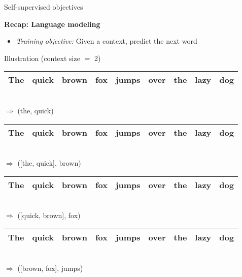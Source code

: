 
\begin{vbframe}{Self-supervised objectives}

\vfill

\textbf{Recap: Language modeling}
	
	\begin{itemize}
		\item \textit{Training objective:} Given a context, predict the next word
	\end{itemize}
	
\begin{block}{Illustration (context size $=$ 2)}
\begin{tabular}{|c|c|c|cccccc|}
\hline
\cellcolor{blue!15}The & \cellcolor{blue!65}quick & brown & fox & jumps & over & the & lazy & dog \\
\hline
\end{tabular}\\
$\Rightarrow$ \quad (the, quick)
\begin{tabular}{|c|c|c|c|ccccc|}
\hline
\cellcolor{blue!15}The & \cellcolor{blue!15}quick & \cellcolor{blue!65}brown & fox & jumps & over & the & lazy & dog \\
\hline
\end{tabular}\\
$\Rightarrow$ \quad ([the, quick], brown)
\begin{tabular}{|c|c|c|c|ccccc|}
\hline
The & \cellcolor{blue!15}quick & \cellcolor{blue!15}brown & \cellcolor{blue!65}fox & jumps & over & the & lazy & dog \\
\hline
\end{tabular}\\
$\Rightarrow$ \quad ([quick, brown], fox)
\begin{tabular}{|c|c|c|c|ccccc|}
\hline
The & quick & \cellcolor{blue!15}brown & \cellcolor{blue!15}fox & \cellcolor{blue!65}jumps & over & the & lazy & dog \\
\hline
\end{tabular}\\
$\Rightarrow$ \quad ([brown, fox], jumps)
\end{block}
	
\vfill

\end{vbframe}


